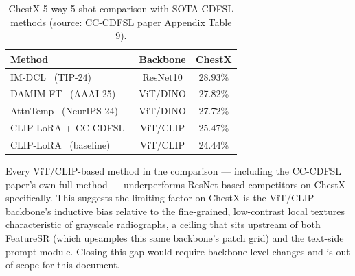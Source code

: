 \documentclass[conference]{IEEEtran}
\begin{document}
\begin{table}[t]
\centering
\caption{ChestX 5-way 5-shot comparison with SOTA CDFSL methods (source: CC-CDFSL paper Appendix Table 9).}
\label{tab:chestx-sota}
\small
\begin{tabular}{lcc}
\toprule
Method & Backbone & ChestX \\
\midrule
IM-DCL~\cite{xu2024imdcl} (TIP-24) & ResNet10 & $\mathbf{28.93\%}$ \\
DAMIM-FT~\cite{ma2025damim} (AAAI-25) & ViT/DINO & 27.82\% \\
AttnTemp~\cite{zou2024attntemp} (NeurIPS-24) & ViT/DINO & 27.72\% \\
CLIP-LoRA + CC-CDFSL~\cite{zhao2026ccdfsl} & ViT/CLIP & 25.47\% \\
CLIP-LoRA~\cite{zanella2024cliplora} (baseline) & ViT/CLIP & 24.44\% \\
\bottomrule
\end{tabular}
\end{table}

Every ViT/CLIP-based method in the comparison --- including the CC-CDFSL paper's own full method --- underperforms ResNet-based competitors on ChestX specifically. This suggests the limiting factor on ChestX is the ViT/CLIP backbone's inductive bias relative to the fine-grained, low-contrast local textures characteristic of grayscale radiographs, a ceiling that sits upstream of both FeatureSR (which upsamples this same backbone's patch grid) and the text-side prompt module. Closing this gap would require backbone-level changes and is out of scope for this document.
\end{document}
